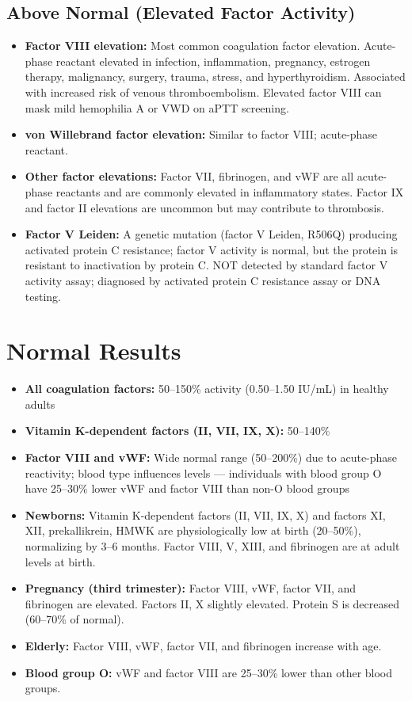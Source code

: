 \subsection*{Above Normal (Elevated Factor Activity)}
\begin{itemize}
  \item \textbf{Factor VIII elevation:} Most common coagulation factor elevation. Acute-phase reactant elevated in infection, inflammation, pregnancy, estrogen therapy, malignancy, surgery, trauma, stress, and hyperthyroidism. Associated with increased risk of venous thromboembolism. Elevated factor VIII can mask mild hemophilia A or VWD on aPTT screening.
  \item \textbf{von Willebrand factor elevation:} Similar to factor VIII; acute-phase reactant.
  \item \textbf{Other factor elevations:} Factor VII, fibrinogen, and vWF are all acute-phase reactants and are commonly elevated in inflammatory states. Factor IX and factor II elevations are uncommon but may contribute to thrombosis.
  \item \textbf{Factor V Leiden:} A genetic mutation (factor V Leiden, R506Q) producing activated protein C resistance; factor V activity is normal, but the protein is resistant to inactivation by protein C. NOT detected by standard factor V activity assay; diagnosed by activated protein C resistance assay or DNA testing.
\end{itemize}

\section*{Normal Results}
\begin{itemize}
  \item \textbf{All coagulation factors:} 50--150\% activity (0.50--1.50 IU/mL) in healthy adults
  \item \textbf{Vitamin K-dependent factors (II, VII, IX, X):} 50--140\%
  \item \textbf{Factor VIII and vWF:} Wide normal range (50--200\%) due to acute-phase reactivity; blood type influences levels --- individuals with blood group O have 25--30\% lower vWF and factor VIII than non-O blood groups
  \item \textbf{Newborns:} Vitamin K-dependent factors (II, VII, IX, X) and factors XI, XII, prekallikrein, HMWK are physiologically low at birth (20--50\%), normalizing by 3--6 months. Factor VIII, V, XIII, and fibrinogen are at adult levels at birth.
  \item \textbf{Pregnancy (third trimester):} Factor VIII, vWF, factor VII, and fibrinogen are elevated. Factors II, X slightly elevated. Protein S is decreased (60--70\% of normal).
  \item \textbf{Elderly:} Factor VIII, vWF, factor VII, and fibrinogen increase with age.
  \item \textbf{Blood group O:} vWF and factor VIII are 25--30\% lower than other blood groups.
\end{itemize}


